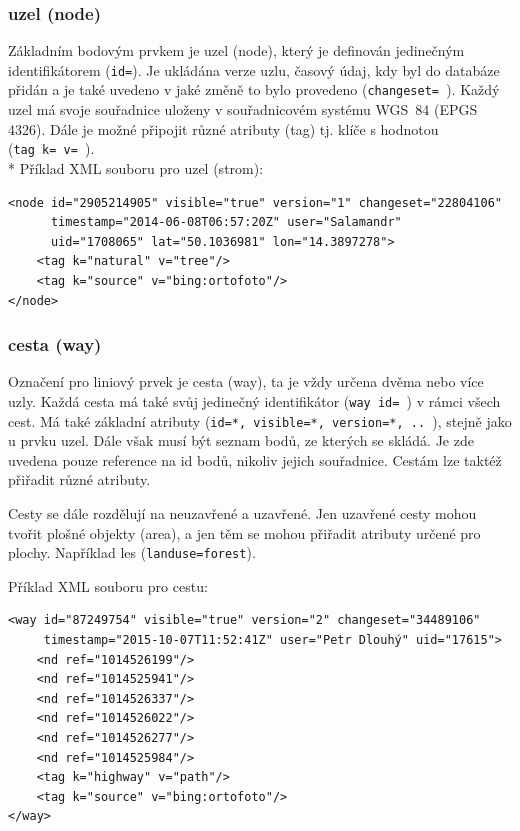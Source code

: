 \subsubsection{uzel (node) }

Základním bodovým prvkem je uzel (node), který je definován jedinečným
identifikátorem ({\tt id=}). 
Je ukládána verze uzlu, časový údaj, kdy byl do databáze přidán
a je také uvedeno v jaké změně to bylo provedeno ({\tt changeset=~}).
Každý uzel má svoje souřadnice uloženy v souřadnicovém systému WGS~84 (EPGS 4326). 
Dále je možné připojit různé atributy (tag) tj. klíče s hodnotou ({\tt tag~k=~v=~}).
\\*
Příklad XML souboru pro uzel (strom):

{\scriptsize \begin{lstlisting}
<node id="2905214905" visible="true" version="1" changeset="22804106" 
      timestamp="2014-06-08T06:57:20Z" user="Salamandr" 
      uid="1708065" lat="50.1036981" lon="14.3897278">
    <tag k="natural" v="tree"/>
    <tag k="source" v="bing:ortofoto"/>
</node>
\end{lstlisting} }

\subsubsection{cesta (way) }

Označení pro liniový prvek je cesta (way), ta je vždy určena dvěma nebo více uzly.
Každá cesta má také svůj jedinečný identifikátor ({\tt way~id=~}) v rámci všech cest.
Má také základní atributy ({\tt id=*, visible=*, version=*, .. }), 
stejně jako u prvku uzel.
Dále však musí být seznam bodů, ze kterých se skládá.
Je zde uvedena pouze reference na id bodů, nikoliv jejich souřadnice.
Cestám lze taktéž přiřadit různé atributy.

Cesty se dále rozdělují na neuzavřené a uzavřené.
Jen uzavřené cesty mohou tvořit plošné objekty (area),
a jen těm se mohou přiřadit atributy určené pro plochy.
Například les ({\tt landuse=forest}).

Příklad XML souboru pro cestu:

{\scriptsize
\begin{lstlisting}
<way id="87249754" visible="true" version="2" changeset="34489106"
     timestamp="2015-10-07T11:52:41Z" user="Petr Dlouhý" uid="17615">
    <nd ref="1014526199"/>
    <nd ref="1014525941"/>
    <nd ref="1014526337"/>
    <nd ref="1014526022"/>
    <nd ref="1014526277"/>
    <nd ref="1014525984"/>
    <tag k="highway" v="path"/>
    <tag k="source" v="bing:ortofoto"/>
</way>
\end{lstlisting}
}
      
